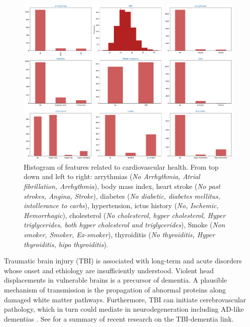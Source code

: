 \documentclass[11pt]{article}
\theoremstyle{definition}
\theoremstyle{remark}
\begin{document}
\begin{figure}[H]
        \centering
        \includegraphics[keepaspectratio, width=\linewidth]{figures/Fig_cardio}
        \caption{Histogram of features related to cardiovascular health. From top down and left to right: arrythmias (\emph{No Arrhythmia, Atrial fibrillation, Arrhythmia}), body mass index, heart stroke (\emph{No past strokes, Angina, Stroke}), diabetes (\emph{No diabetic, diabetes mellitus, intollerance to carbs}), hypertension, ictus history (\emph{No, Ischemic, Hemorrhagic}), cholesterol (\emph{No cholesterol, hyper cholesterol, Hyper triglycerides, both hyper cholesterol and triglycerides}), Smoke (\emph{Non smoker, Smoker, Ex-smoker}), thyroiditis (\emph{No thyroiditis, Hyper thyroiditis, hipo thyroiditis}). } 
        \label{fig:cardio}
\end{figure}



Traumatic brain injury (TBI) is associated with long-term and acute disorders whose onset and ethiology are insufficiently understood. Violent head displacements in vulnerable brains is a precursor of dementia. A plausible mechanism of transmission is the propagation of abnormal proteins along damaged white matter pathways. Furthermore, TBI can initiate cerebrovascular pathology, which in turn could mediate in neurodegeneration including AD-like dementias \cite{ramos2018traumatic}. See \cite{mendez2017relationship} for a summary of recent research on the TBI-dementia link. 
\end{document}
